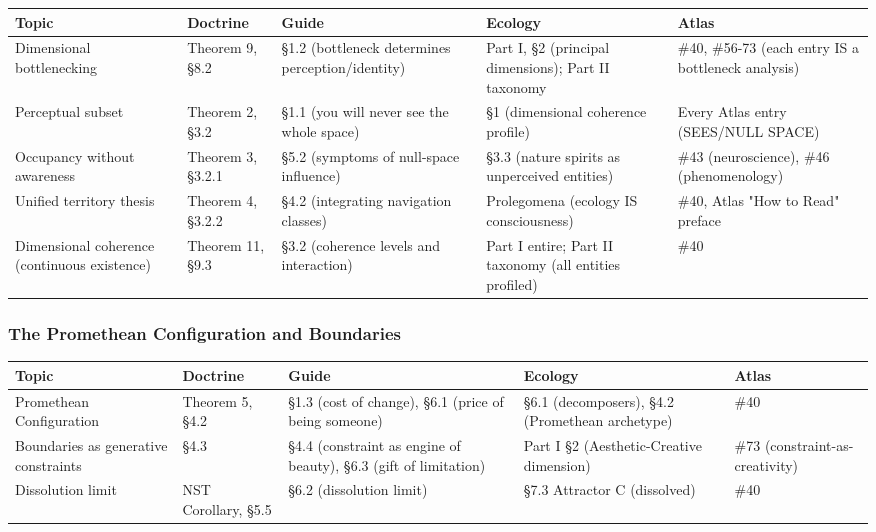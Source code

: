 {\small
\begin{longtable}{>{\raggedright\arraybackslash}p{} >{\raggedright\arraybackslash}p{} >{\raggedright\arraybackslash}p{} >{\raggedright\arraybackslash}p{} >{\raggedright\arraybackslash}p{}}
\toprule
\textbf{Topic} & \textbf{Doctrine} & \textbf{Guide} & \textbf{Ecology} & \textbf{Atlas} \\
\midrule
\endhead
Dimensional bottlenecking & Theorem 9, §8.2 & §1.2 (bottleneck determines perception/\allowbreak identity) & Part I, §2 (principal dimensions); Part II taxonomy & \#40, \#56-73 (each entry IS a bottleneck analysis) \\
Perceptual subset & Theorem 2, §3.2 & §1.1 (you will never see the whole space) & §1 (dimensional coherence profile) & Every Atlas entry (SEES/\allowbreak NULL SPACE) \\
Occupancy without awareness & Theorem 3, §3.2.1 & §5.2 (symptoms of null-space influence) & §3.3 (nature spirits as unperceived entities) & \#43 (neuroscience), \#46 (phenomenology) \\
Unified territory thesis & Theorem 4, §3.2.2 & §4.2 (integrating navigation classes) & Prolegomena (ecology IS consciousness) & \#40, Atlas "How to Read" preface \\
Dimensional coherence (continuous existence) & Theorem 11, §9.3 & §3.2 (coherence levels and interaction) & Part I entire; Part II taxonomy (all entities profiled) & \#40 \\
\bottomrule
\end{longtable}
}



\subsubsection*{The Promethean Configuration and Boundaries}



{\small
\begin{longtable}{>{\raggedright\arraybackslash}p{} >{\raggedright\arraybackslash}p{} >{\raggedright\arraybackslash}p{} >{\raggedright\arraybackslash}p{} >{\raggedright\arraybackslash}p{}}
\toprule
\textbf{Topic} & \textbf{Doctrine} & \textbf{Guide} & \textbf{Ecology} & \textbf{Atlas} \\
\midrule
\endhead
Promethean Configuration & Theorem 5, §4.2 & §1.3 (cost of change), §6.1 (price of being someone) & §6.1 (decomposers), §4.2 (Promethean archetype) & \#40 \\
Boundaries as generative constraints & §4.3 & §4.4 (constraint as engine of beauty), §6.3 (gift of limitation) & Part I §2 (Aesthetic-Creative dimension) & \#73 (constraint-as-creativity) \\
Dissolution limit & NST Corollary, §5.5 & §6.2 (dissolution limit) & §7.3 Attractor C (dissolved) & \#40 \\
\bottomrule
\end{longtable}
}



